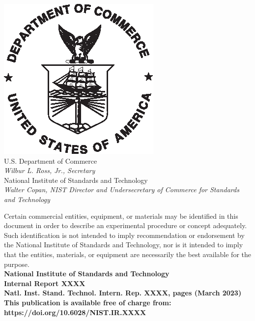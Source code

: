 \documentclass[12pt]{article}
\newcommand{\pubnumber}{XXXX}
\newcommand{\DOI}{https://doi.org/10.6028/NIST.IR.XXXX}
\newcommand{\monthyear}{March 2023}
\begin{document}
\begin{titlepage}
\begin{flushright}
\includegraphics[width=0.18\linewidth]{DoC-logo.eps}\\ 
 \vfill
\footnotesize U.S. Department of Commerce\\ 
\textit{Wilbur L. Ross, Jr., Secretary}\\
\vspace{10pt}
National Institute of Standards and Technology\\ 
\textit{Walter Copan, NIST Director and Undersecretary of Commerce for Standards and Technology}  
\end{flushright}
\end{titlepage}
\begin{titlepage}
\begin{flushright}
\footnotesize  Certain commercial entities, equipment, or materials may be identified
in this document in order to describe an experimental procedure or concept
adequately. Such identification is not intended to imply recommendation or
endorsement by the National Institute of Standards and Technology, nor is it intended
to imply that the entities, materials, or equipment are necessarily the best
available for the purpose.\\

\vfill
\normalsize \textbf{National Institute of Standards and Technology \\ Internal Report \pubnumber\\ 
Natl. Inst. Stand. Technol. Intern. Rep. \pubnumber, \pageref{LastPage} pages (\monthyear)} \\
\vspace{12pt}
\textbf{This publication is available free of charge from: \DOI}
\vfill
\end{flushright}
\end{titlepage}
\end{document}
